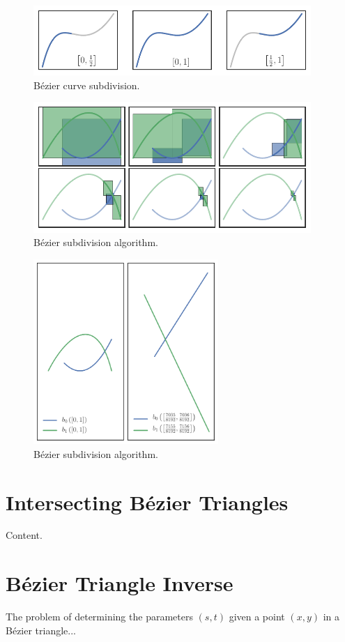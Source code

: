 \begin{figure}
  \includegraphics[width=0.9375\textwidth]{../images/curved-mesh/subdivide_curve.pdf}
  \centering
  \caption{B\'{e}zier curve subdivision.}
  \label{fig:bezier-curve-subdivision}
\end{figure}

\begin{figure}
  \includegraphics[width=0.9375\textwidth]{../images/curved-mesh/subdivision_process.pdf}
  \centering
  \caption{B\'{e}zier subdivision algorithm.}
  \label{fig:bezier-subdivision-process}
\end{figure}

\begin{figure}
  \includegraphics[width=0.625\textwidth]{../images/curved-mesh/subdivision_linearized.pdf}
  \centering
  \caption{B\'{e}zier subdivision algorithm.}
  \label{fig:bezier-subdivision-linearized}
\end{figure}

\section{Intersecting B\'{e}zier Triangles}

Content.

\section{B\'{e}zier Triangle Inverse}

The problem of determining the parameters \((s, t)\) given a point
\((x, y)\) in a B\'{e}zier triangle...
